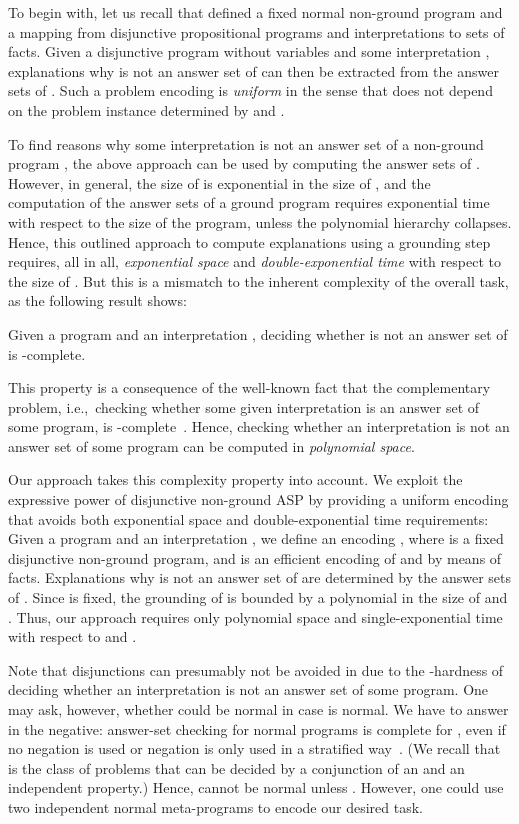\documentclass{tlp}
\newcommand{\iec}{i.e.,\ }
\begin{document}
To begin with, let us recall that 
defined a fixed normal non-ground program   and a mapping  from disjunctive propositional programs  and interpretations 
to sets of facts. 
Given a disjunctive program  without variables and some interpretation , explanations
why  is not an answer set of  can then be extracted from the answer sets of . 
Such a problem encoding is 
\emph{uniform} in the sense that  does not depend on the problem instance determined by  and .

To find reasons why some interpretation  is not an answer set of a non-ground program , 
the above approach can be used by computing the answer sets of .
However, in general, the size of  is exponential in the size of , and the computation 
of the answer sets of a ground program requires exponential time with respect
to the size of the program, unless the polynomial hierarchy collapses.
Hence, this outlined approach to compute explanations using a grounding step requires, all in all, \emph{exponential space} and \emph{double-exponential time} with respect to the size of .
But this is a mismatch to the inherent complexity of the overall task, as the following result shows: 

\begin{proposition}
\label{prop:complexity}
Given a program  and an interpretation , deciding whether  is not an answer set of  is -complete. 
\end{proposition}
This property is a consequence of the well-known fact that the complementary problem, \iec checking whether some given interpretation is an answer set of some program, is -complete~\cite{eiter04}.
Hence, checking whether an interpretation is not an answer set of some program 
can be computed in \emph{polynomial space}.

Our approach takes this complexity property into account.  We exploit the expressive power of disjunctive non-ground ASP by providing a
uniform encoding that avoids both exponential space and double-exponential time requirements:
Given a program  and an interpretation , we define an encoding , where  is a fixed disjunctive non-ground program, and  is an efficient encoding  of  and  by means of facts.
Explanations why  is not an answer set of  are determined by the answer sets of .
Since  is fixed, the grounding of  is bounded by a polynomial in the size of  and . Thus, our
approach requires only polynomial space and single-exponential time with respect to  and .

Note that disjunctions can presumably not be avoided in  due to the  -hardness of 
deciding whether an interpretation is not an answer set of some program.
One may ask, however, whether  could be normal in case  is normal.
We have to answer in the negative: answer-set checking for normal programs is complete for , 
even if no negation is used or negation is only used in a stratified way~\cite{eiter04}.
(We recall that  is the class of problems that  can be  decided by a conjunction
of an  and an independent   property.)
Hence,  cannot be normal unless .
However, one could use two independent normal meta-programs to encode our desired task.
\end{document}
